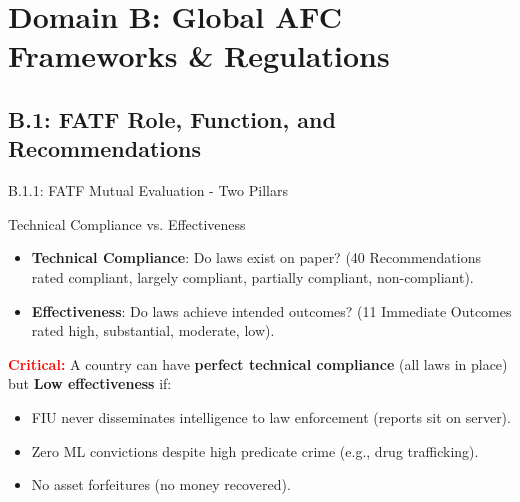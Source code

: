 \documentclass{beamer}
\begin{document}
	
	\section{Domain B: Global AFC Frameworks \& Regulations}
	
	\subsection{B.1: FATF Role, Function, and Recommendations}
	
	\begin{frame}{B.1.1: FATF Mutual Evaluation - Two Pillars}
		\begin{block}{Technical Compliance vs. Effectiveness}
			\begin{itemize}
				\item \textbf{Technical Compliance}: Do laws exist on paper? (40 Recommendations rated compliant, largely compliant, partially compliant, non-compliant).
				\item \textbf{Effectiveness}: Do laws achieve intended outcomes? (11 Immediate Outcomes rated high, substantial, moderate, low).
			\end{itemize}
		\end{block}
		\textcolor{red}{\textbf{ Critical:}} A country can have \textbf{perfect technical compliance} (all laws in place) but \textbf{Low effectiveness} if:
		\begin{itemize}
			\item FIU never disseminates intelligence to law enforcement (reports sit on server).
			\item Zero ML convictions despite high predicate crime (e.g., drug trafficking).
			\item No asset forfeitures (no money recovered).
		\end{itemize}
	\end{frame}
	
\end{document}
